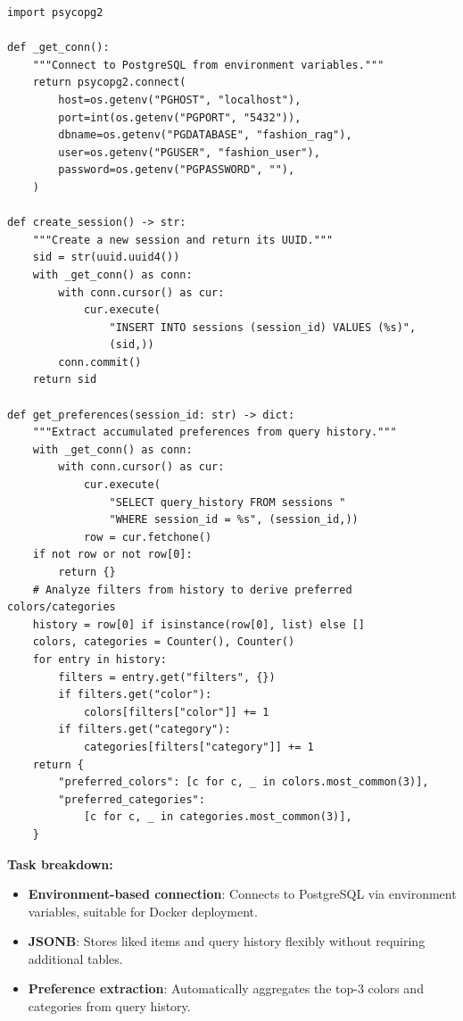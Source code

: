 \documentclass[12pt, twoside]{report}
\begin{document}
\begin{lstlisting}[caption={PostgreSQL Data Access Layer --- agent/memory.py}]
import psycopg2

def _get_conn():
    """Connect to PostgreSQL from environment variables."""
    return psycopg2.connect(
        host=os.getenv("PGHOST", "localhost"),
        port=int(os.getenv("PGPORT", "5432")),
        dbname=os.getenv("PGDATABASE", "fashion_rag"),
        user=os.getenv("PGUSER", "fashion_user"),
        password=os.getenv("PGPASSWORD", ""),
    )

def create_session() -> str:
    """Create a new session and return its UUID."""
    sid = str(uuid.uuid4())
    with _get_conn() as conn:
        with conn.cursor() as cur:
            cur.execute(
                "INSERT INTO sessions (session_id) VALUES (%s)",
                (sid,))
        conn.commit()
    return sid

def get_preferences(session_id: str) -> dict:
    """Extract accumulated preferences from query history."""
    with _get_conn() as conn:
        with conn.cursor() as cur:
            cur.execute(
                "SELECT query_history FROM sessions "
                "WHERE session_id = %s", (session_id,))
            row = cur.fetchone()
    if not row or not row[0]:
        return {}
    # Analyze filters from history to derive preferred colors/categories
    history = row[0] if isinstance(row[0], list) else []
    colors, categories = Counter(), Counter()
    for entry in history:
        filters = entry.get("filters", {})
        if filters.get("color"):
            colors[filters["color"]] += 1
        if filters.get("category"):
            categories[filters["category"]] += 1
    return {
        "preferred_colors": [c for c, _ in colors.most_common(3)],
        "preferred_categories":
            [c for c, _ in categories.most_common(3)],
    }
\end{lstlisting}

\textbf{Task breakdown:}
\begin{itemize}
    \item \textbf{Environment-based connection}: Connects to PostgreSQL via environment variables, suitable for Docker deployment.
    \item \textbf{JSONB}: Stores liked items and query history flexibly without requiring additional tables.
    \item \textbf{Preference extraction}: Automatically aggregates the top-3 colors and categories from query history.
\end{itemize}
\end{document}
